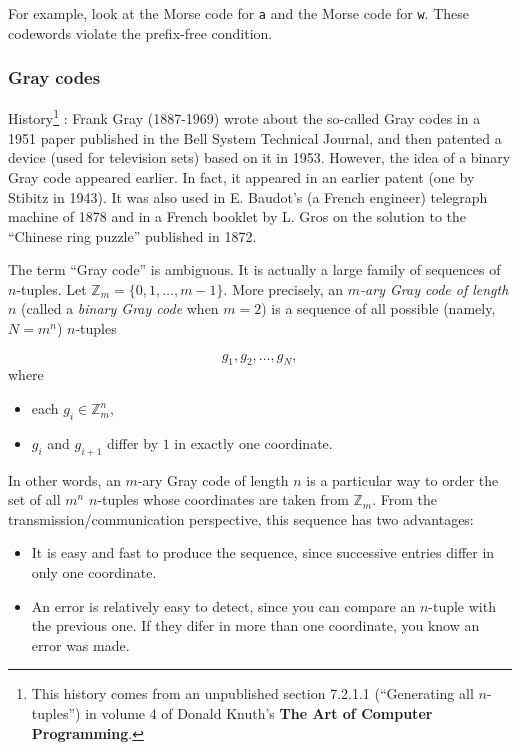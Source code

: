 For example, look at the Morse code for {\tt a} and the Morse code for
{\tt w}. These codewords violate the prefix-free condition.

\subsubsection{Gray codes}

History\footnote{This
history comes from an unpublished section 7.2.1.1
(``Generating all $n$-tuples'')
in volume 4 of Donald Knuth's {\bf The Art of Computer Programming}.
}
: Frank Gray (1887-1969) wrote about the so-called Gray codes in a
1951 paper published in the Bell System Technical Journal,
and then patented a device (used for television sets)
based on it in 1953. However, the idea of a binary Gray code
appeared earlier. In fact, it appeared in an earlier patent
(one by Stibitz in 1943). It was also used in E. Baudot's
(a French engineer) telegraph machine of 1878 and in
a French booklet by L. Gros on the solution to the
``Chinese ring puzzle'' published in 1872.

The term ``Gray code'' is ambiguous. It is actually a
large family of sequences of $n$-tuples. Let
${\mathbb{Z}}_m=\{0,1,\dots,m-1\}$. More precisely, an
{\it $m$-ary Gray code of length $n$} (called a {\it binary
Gray code} when $m=2$) is a sequence of
all possible (namely, $N=m^n$) $n$-tuples

\[
g_1,g_2,\dots, g_N,
\]
where
\begin{itemize}
\item
each $g_i\in {\mathbb{Z}}_m^n$,
\item
$g_i$ and $g_{i+1}$ differ by $1$ in exactly one
coordinate.
\end{itemize}
In other words, an $m$-ary Gray code of length
$n$ is a particular way to order the set of all
$m^n$ $n$-tuples whose coordinates are taken from
${\mathbb{Z}}_m$. From the transmission/communication
perspective, this sequence has two advantages:

\begin{itemize}
\item
It is easy and fast to produce the sequence, since
successive entries differ in only one coordinate.

\item
An error is relatively easy to detect, since you can
compare an $n$-tuple with the previous one. If they
difer in more than one coordinate, you know an error
was made.

\end{itemize}

